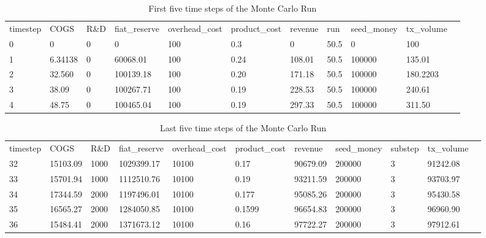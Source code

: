 \documentclass[12pt]{extarticle}
\begin{document}
\begin{table}[h]
	\centering
	\begin{adjustbox}{max width=\textwidth}
	\begin{tabular}{lllllllllll}
		\toprule
		timestep & COGS             & R\&D & fiat\_reserve & overhead\_cost & product\_cost     & revenue   & run  & seed\_money & tx\_volume \\
		0        & 0                & 0    & 0             & 100            & 0.3               & 0         & 50.5 & 0           & 100        \\
		1        & 6.34138          & 0    & 60068.01   & 100            & 0.24            & 108.01 & 50.5 & 100000      & 135.01   \\
		2        & 32.560         & 0    & 100139.18  & 100            & 0.20            & 171.18 & 50.5 & 100000      & 180.2203   \\
		3        & 38.09 & 0    & 100267.71  & 100            & 0.19 & 228.53 & 50.5 & 100000      & 240.61   \\
		4        & 48.75 & 0    & 100465.04  & 100            & 0.19            & 297.33 & 50.5 & 100000      & 311.50  
	\end{tabular}
\end{adjustbox}
\caption{First five time steps of the Monte Carlo Run}
\label{table:FirstFive}
\end{table}

\begin{table}[h]
	\centering
	\begin{adjustbox}{max width=\textwidth}
	\begin{tabular}{lllllllllll}
		\toprule
		timestep & COGS        & R\&D & fiat\_reserve & overhead\_cost & product\_cost & revenue          & seed\_money & substep & tx\_volume       \\
		32       & 15103.09 & 1000 & 1029399.17 & 10100          & 0.17        & 90679.09 & 200000      & 3       & 91242.08 \\
		33       & 15701.94 & 1000 & 1112510.76 & 10100          & 0.19        & 93211.59 & 200000      & 3       & 93703.97 \\
		34       & 17344.59 & 2000 & 1197496.01 & 10100          & 0.177        & 95085.26 & 200000      & 3       & 95430.58 \\
		35       & 16565.27 & 2000 & 1284050.85 & 10100          & 0.1599        & 96654.83 & 200000      & 3       & 96960.90 \\
		36       & 15484.41 & 2000 & 1371673.12 & 10100          & 0.16        & 97722.27      & 200000      & 3       & 97912.61
	\end{tabular}
\end{adjustbox}
\caption{Last five time steps of the Monte Carlo Run}
\label{table:LastFive}
\end{table}
\end{document}
